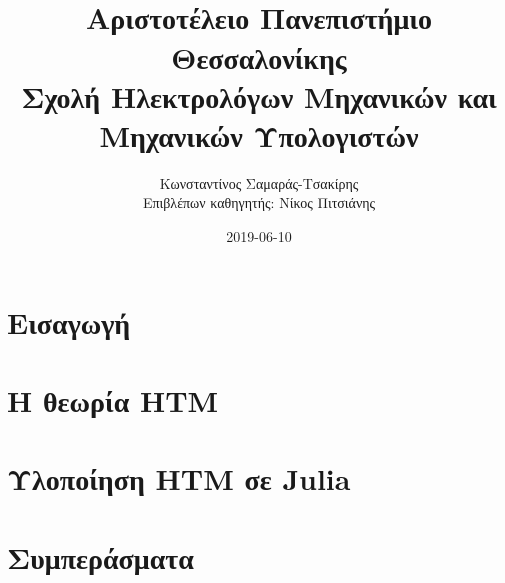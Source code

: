 \documentclass[a4paper,11pt,twoside]{report}
\title{
\titlestring \\
{\large Αριστοτέλειο Πανεπιστήμιο Θεσσαλονίκης}\\
{\large Σχολή Ηλεκτρολόγων Μηχανικών και Μηχανικών Υπολογιστών}
}
\author{Κωνσταντίνος Σαμαράς-Τσακίρης\\ \bigskip
Επιβλέπων καθηγητής: Νίκος Πιτσιάνης}
\date{2019-06-10}
\begin{document}
\maketitle


\tableofcontents{}
\listoffigures

\chapter{Εισαγωγή}


\chapter{Η θεωρία HTM}


\chapter{Υλοποίηση HTM σε Julia} \label{impl}




\chapter{Συμπεράσματα}


\printbibliography

%
\end{document}
